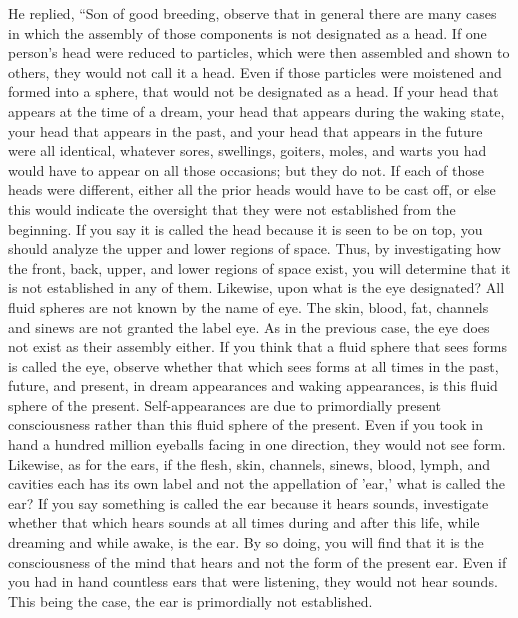 \documentclass[a4paper,11pt,twoside,final]{book}
\begin{document}
He replied, ``Son of good breeding, observe that in general there are
many cases in which the assembly of those components is not designated
as a head. If one person's head were reduced to particles, which were
then assembled and shown to others, they would not call it a
head. Even if those particles were moistened and formed into a sphere,
that would not be designated as a head.  If your head that appears at
the time of a dream, your head that appears during the waking state,
your head that appears in the past, and your head that appears in the
future were all identical, whatever sores, swellings, goiters, moles,
and warts you had would have to appear on all those occasions; but
they do not. If each of those heads were different, either all the
prior heads would have to be cast off, or else this would indicate the
oversight that they were not established from the beginning. If you
say it is called the head because it is seen to be on top, you should
analyze the upper and lower regions of space.  Thus, by investigating
how the front, back, upper, and lower regions of space exist, you will
determine that it is not established in any of them.  Likewise, upon
what is the eye designated? All fluid spheres are not known by the
name of eye. The skin, blood, fat, channels and sinews are not granted
the label eye. As in the previous case, the eye does not exist as
their assembly either. If you think that a fluid sphere that sees
forms is called the eye, observe whether that which sees forms at all
times in the past, future, and present, in dream appearances and
waking appearances, is this fluid sphere of the
present. Self-appearances are due to primordially present
consciousness rather than this fluid sphere of the present. Even if
you took in hand a hundred million eyeballs facing in one direction,
they would not see form.  Likewise, as for the ears, if the flesh,
skin, channels, sinews, blood, lymph, and cavities each has its own
label and not the appellation of 'ear,' what is called the ear? If you
say something is called the ear because it hears sounds, investigate
whether that which hears sounds at all times during and after this
life, while dreaming and while awake, is the ear. By so doing, you
will find that it is the consciousness of the mind that hears and not
the form of the present ear. Even if you had in hand countless ears
that were listening, they would not hear sounds. This being the case,
the ear is primordially not established.
\end{document}
